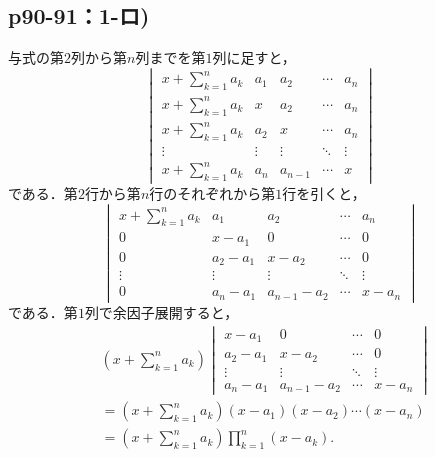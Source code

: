 \documentclass[uplatex,dvipdfmx,a4paper,11pt,fleqn]{jsarticle}
\begin{document}
\subsection*{p90-91：1-ロ)}

\begin{tleftbar}
    与式の第$2$列から第$n$列までを第$1$列に足すと，
    \[
        \begin{vmatrix} 
            x+\sum_{k=1}^{n} a_k & a_1 & a_2 & \cdots & a_n \\
            x+\sum_{k=1}^{n} a_k & x & a_2 & \cdots & a_n \\
            x+\sum_{k=1}^{n} a_k & a_2 & x &\cdots & a_n \\
            \vdots & \vdots & \vdots & \ddots & \vdots \\
            x+\sum_{k=1}^{n} a_k & a_n & a_{n-1} & \cdots & x
        \end{vmatrix}
    \]
    である．第$2$行から第$n$行のそれぞれから第$1$行を引くと，
    \[
        \begin{vmatrix} 
            x+\sum_{k=1}^{n} a_k & a_1 & a_2 & \cdots & a_n \\
            0 & x-a_1 & 0 & \cdots & 0 \\
            0 & a_2 -a_1 & x-a_2 &\cdots & 0 \\
            \vdots & \vdots & \vdots & \ddots & \vdots \\
            0 & a_n-a_1 & a_{n-1}-a_2 & \cdots & x-a_n 
        \end{vmatrix}
    \]
    である．第$1$列で余因子展開すると，
    \begin{align*} 
        & 
        (x+\sum_{k=1}^{n} a_k)
        \begin{vmatrix} 
            x-a_1 & 0 & \cdots & 0 \\
            a_2 -a_1 & x-a_2 &\cdots & 0 \\
            \vdots & \vdots & \ddots & \vdots \\
            a_n-a_1 & a_{n-1}-a_2 & \cdots & x-a_n 
        \end{vmatrix}
        \\
        & = (x+\sum_{k=1}^{n} a_k) (x-a_1)(x-a_2) \dotsm (x-a_n) \\
        & = (x+\sum_{k=1}^{n} a_k) \prod_{k=1}^{n} (x-a_k).
    \end{align*}
    \end{tleftbar}
    \newpage 
\end{document}
